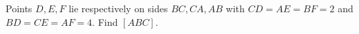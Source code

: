 Points $D,E,F$ lie respectively on sides $BC,CA,AB$ with $CD=AE=BF=2$ and $BD=CE=AF=4$. Find $[ABC]$.

